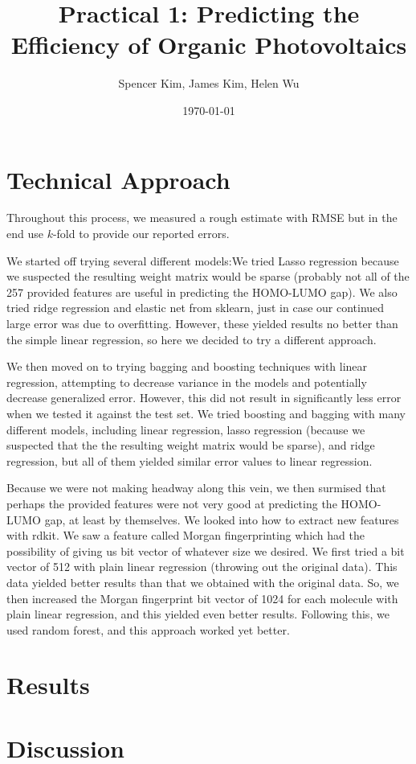 \documentclass[11pt]{article}
\title{Practical 1: Predicting the Efficiency of Organic Photovoltaics}
\author{Spencer Kim, James Kim, Helen Wu}
\date{\today}
\begin{document}
\maketitle
\section{Technical Approach}
Throughout this process, we measured a rough estimate with RMSE but in the end use $k$-fold to provide our reported errors. 

We started off trying several different models:We tried Lasso regression because we suspected the resulting weight matrix would be sparse (probably not all of the 257 provided features are useful in predicting the HOMO-LUMO gap). We also tried ridge regression and elastic net from sklearn, just in case our continued large error was due to overfitting. However, these yielded results no better than the simple linear regression, so here we decided to try a different approach.

We then moved on to trying bagging and boosting techniques with linear regression, attempting to decrease variance in the models and potentially decrease generalized error. However, this did not result in significantly less error when we tested it against the test set. We tried boosting and bagging with many different models, including linear regression, lasso regression (because we suspected that the the resulting weight matrix would be sparse), and ridge regression, but all of them yielded similar error values to linear regression.

Because we were not making headway along this vein, we then surmised that perhaps the provided features were not very good at predicting the HOMO-LUMO gap, at least by themselves. We looked into how to extract new features with rdkit. We saw a feature called Morgan fingerprinting which had the possibility of giving us bit vector of whatever size we desired. We first tried a bit vector of 512 with plain linear regression (throwing out the original data). This data yielded better results than that we obtained with the original data. So, we then increased the Morgan fingerprint bit vector of 1024 for each molecule with plain linear regression, and this yielded even better results. Following this, we used random forest, and this approach worked yet better.

\section{Results}


\section{Discussion}
\end{document}
